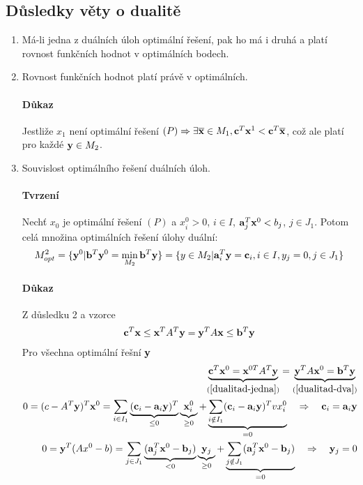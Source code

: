 \documentclass[a4paper,12pt,titlepage]{article}
\begin{document}
\subsection{Důsledky věty o dualitě}
\setcounter{equation}{0}
\begin{enumerate}
	\item Má-li jedna z duálních úloh optimální řešení, pak ho má i druhá a
	platí rovnost funkčních hodnot v optimálních bodech.
	\item Rovnost funkčních hodnot platí právě v optimálních.
	\paragraph{Důkaz}
	Jestliže $x_1$ není optimální řešení $(P) \Rightarrow \exists \overline{\mathbf{x}}
	\in M_1, \mathbf{c}^T \mathbf{x}^1 < \mathbf{c}^T \overline{\mathbf{x}}$, což ale platí pro každé $\mathbf{y}
	\in M_2$.
	\item Souvislost optimálního řešení duálních úloh. 
	\paragraph{Tvrzení}
	Nechť $x_0$ je optimální
	řešení $(P)$ a $x_i^0 > 0$, $i \in I$, $\mathbf{a}_j^T \mathbf{x}^0 < b_j$, $j \in J_1$.
	Potom celá množina optimálních řešení úlohy duální:
	\begin{align}
		M^2_{opt} = \{ \mathbf{y}^0 | \mathbf{b}^T \mathbf{y}^0 = \min_{M_2} \mathbf{b}^T \mathbf{y} \} = 
			\{ y \in M_2 | \mathbf{a}^T_i \mathbf{y} = \mathbf{c}_i, i \in I, y_j = 0, j \in J_1 \}
	\end{align}
	\paragraph{Důkaz}
	Z důsledku 2 a vzorce 
	\begin{align}
		\mathbf{c}^T \mathbf{x} \le \mathbf{x}^T A^T \mathbf{y} = \mathbf{y}^T A \mathbf{x} \le \mathbf{b}^T \mathbf{y}
	\end{align}
	Pro všechna optimální řešní $\mathbf{y}$
	\begin{align}
		\underbrace{\mathbf{c}^T \mathbf{x}^0 = \mathbf{x}^{0T} A^T \mathbf{y}}_{(\ref{dualitad-jedna})}
		= \underbrace{\mathbf{y}^T A \mathbf{x}^0 = \mathbf{b}^T \mathbf{y}}_{(\ref{dualitad-dva})} \\
		\label{dualitad-jedna}
		0 = (c-A^T\mathbf{y})^T \mathbf{x}^0 = \sum_{i\in I_1} \underbrace{(\mathbf{c}_i -
		\mathbf{a}_i\mathbf{y})^T}_{\le 0} \underbrace{\mathbf{x}_i^0}_{\ge 0} +
		\underbrace{\sum_{i \notin I_1}(\mathbf{c}_i - \mathbf{a}_i \mathbf{y})^T vx_i^0}_{ = 0}
			\quad\Rightarrow\quad \mathbf{c}_i = \mathbf{a}_i \mathbf{y} \\
		\label{dualitad-dva}
		0 = \mathbf{y}^T(Ax^0 - b) = \sum_{j\in J_1} \underbrace{(\mathbf{a}_j^T \mathbf{x}^0 -
		\mathbf{b}_j)}_{<0} \underbrace{\mathbf{y}_j}_{\ge 0} +
		\underbrace{\sum_{j\notin J_1} (\mathbf{a}_j^T \mathbf{x}^0 - \mathbf{b}_j)}_{=0}
			\quad\Rightarrow\quad \mathbf{y}_j = 0
	\end{align}

\end{enumerate}
\end{document}
